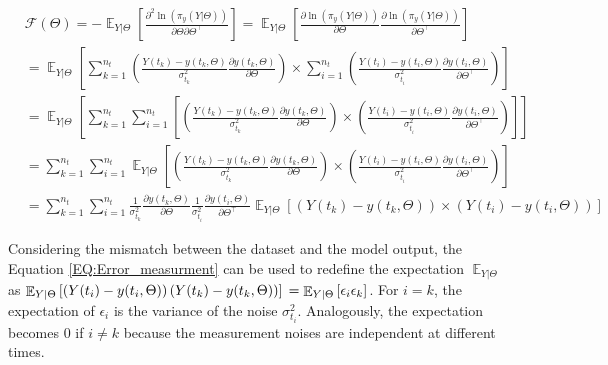 \documentclass[../Article_Design_of_Experiment.tex]{subfiles}
\begin{document}
	{\scriptsize
	\begin{equation}
		\begin{aligned}
		&\mathcal{F}(\Theta) = - \mathop{\mathbb{E}}_{Y|\Theta} \left[ \frac{\partial^2 \ln (\pi_y (Y|\Theta))}{\partial \Theta \partial \Theta^\top} \right] = \mathop{\mathbb{E}}_{Y|\Theta} \left[ \frac{\partial \ln (\pi_y (Y|\Theta))}{\partial \Theta} \frac{\partial \ln (\pi_y (Y|\Theta))}{\partial \Theta^\top} \right] \nonumber \\
		&= \mathop{\mathbb{E}}_{Y|\Theta} \left[ \sum_{k=1}^{n_t} \left( \frac{Y(t_k) - y(t_k, \Theta)}{\sigma_{t_k}^2} \frac{\partial y(t_k, \Theta)}{\partial \Theta} \right) \times  \sum_{i=1}^{n_t} \left( \frac{Y(t_i) - y(t_i, \Theta)}{\sigma_{t_i}^2} \frac{\partial y(t_i, \Theta)}{\partial \Theta^\top} \right) \right] \nonumber \\
		&= \mathop{\mathbb{E}}_{Y|\Theta} \left[ \sum_{k=1}^{n_t} \sum_{i=1}^{n_t} \left[ \left( \frac{Y(t_k) - y(t_k, \Theta)}{\sigma_{t_k}^2} \frac{\partial y(t_k, \Theta)}{\partial \Theta} \right) \times \left( \frac{Y(t_i) - y(t_i, \Theta)}{\sigma_{t_i}^2} \frac{\partial y(t_i, \Theta)}{\partial \Theta^\top} \right) \right] \right] \nonumber \\
		&= \sum_{k=1}^{n_t} \sum_{i=1}^{n_t} \mathop{\mathbb{E}}_{Y|\Theta} \left[ \left( \frac{Y(t_k) - y(t_k, \Theta)}{\sigma_{t_k}^2} \frac{\partial y(t_k, \Theta)}{\partial \Theta} \right) \times \left( \frac{Y(t_i) - y(t_i, \Theta)}{\sigma_{t_i}^2} \frac{\partial y(t_i, \Theta)}{\partial \Theta^\top} \right) \right] \nonumber \\
		&= \sum_{k=1}^{n_t} \sum_{i=1}^{n_t} \frac{1}{\sigma_{t_k}^2} \frac{\partial y(t_k, \Theta)}{\partial \Theta} \frac{1}{\sigma_{t_i}^2} \frac{\partial y(t_i, \Theta)}{\partial \Theta^\top} \mathop{\mathbb{E}}_{Y|\Theta} \left[ \left( Y(t_k) - y(t_k, \Theta) \right) \times \left( Y(t_i) - y(t_i, \Theta) \right) \right] 
	\end{aligned} 
	\end{equation} }
	
	Considering the mismatch between the dataset and the model output, the Equation \ref{EQ:Error_measurment} can be used to redefine the expectation $\mathop{\mathbb{E}}_{Y|\Theta}$ as $\mathop{\mathbb{E}}_{Y|\Theta} \left[ \left( Y(t_i) - y(t_i, \Theta) \right) \left( Y(t_k) - y(t_k, \Theta) \right) \right]\\ = \mathop{\mathbb{E}}_{Y|\Theta} \left[ \epsilon_i \epsilon_k \right]$. For $i=k$, the expectation of $\epsilon_i$ is the variance of the noise $\sigma_{t_i}^2$. Analogously, the expectation becomes 0 if $i \neq k$ because the measurement noises are independent at different times.
	
\end{document}
